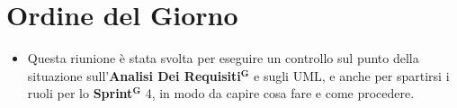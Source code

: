 \documentclass[a4paper,12pt]{article}
\newcommand{\term}[1]{\textbf{#1}$^\mathbf{G}$}
\begin{document}
\clearpage

\clearpage
\tableofcontents
\thispagestyle{empty} %
\clearpage


\section{Ordine del Giorno}
\begin{itemize}
    \item Questa riunione è stata svolta per eseguire un controllo sul punto della situazione sull'\term{Analisi Dei Requisiti} e sugli UML, e anche per spartirsi i ruoli per lo \term{Sprint} 4, in modo da capire cosa fare e come procedere.
\end{itemize}

\end{document}
